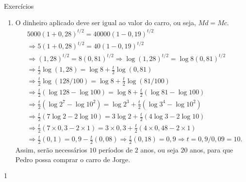 \begin{answer}{Exercícios}
{\begin{enumerate}
	\item
		O dinheiro aplicado deve ser igual ao valor do carro, ou seja, $Md = Mc$.
		\begin{align*}
		&5000(1+0{,}28)^{t/2} = 40000(1-0{,}19)^{t/2} \\
		&\Rightarrow  5(1+0{,}28)^{t/2} = 40(1-0{,}19)^{t/2}\\
		&\Rightarrow  (1{,}28)^{t/2} = 8(0{,}81)^{t/2}\Rightarrow  \log (1{,}28)^{t/2} = \log 8(0{,}81)^{t/2}\\
		&\Rightarrow  \frac{t}{2}\log (1{,}28) = \log 8 + \frac{t}{2}\log(0{,}81)\\
		&\Rightarrow  \frac{t}{2}\log (128/100) = \log 8 + \frac{t}{2}\log(81/100)\\
		&\Rightarrow  \frac{t}{2}(\log 128-\log 100) = \log 8 + \frac{t}{2}(\log81-\log 100)\\
		&\Rightarrow  \frac{t}{2}(\log 2^7-\log 10^2) = \log 2^3 + \frac{t}{2}(\log 3^4-\log 10^2)\\
		&\Rightarrow  \frac{t}{2}(7\log 2-2\log 10) = 3\log 2 + \frac{t}{2}(4\log 3-2\log 10)\\
		&\Rightarrow  \frac{t}{2}(7\times 0{,}3-2\times 1) = 3 \times 0{,}3 + \frac{t}{2}(4 \times 0{,}48-2\times 1)\\
		&\Rightarrow  \frac{t}{2}(0{,}1) = 0{,}9 - \frac{t}{2}(0{,}08)\Rightarrow  \frac{t}{2}(0{,}18) = 0{,}9\Rightarrow  t = 0{,}9/0{,}09 = 10.
		\end{align*}
		Assim, serão necessários $10$ períodos de $2$ anos, ou seja $20$ anos, para que Pedro possa comprar o carro de Jorge.
	\end{enumerate}
}{1}
\end{answer}
